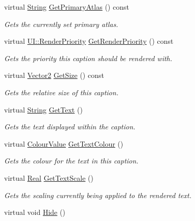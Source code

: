 \begin{DoxyCompactItemize}
virtual \hyperlink{namespaceMezzanine_acf9fcc130e6ebf08e3d8491aebcf1c86}{String} \hyperlink{classMezzanine_1_1UI_1_1Caption_a5c401e39f028e14426714197210e186a}{GetPrimaryAtlas} () const 
\begin{DoxyCompactList}\small\item\em Gets the currently set primary atlas. \item\end{DoxyCompactList}\item 
virtual \hyperlink{namespaceMezzanine_1_1UI_ac4c753eb6b5d66350a243acc9ce54130}{UI::RenderPriority} \hyperlink{classMezzanine_1_1UI_1_1Caption_aadae4d2bb1e8db600864e0121a02e213}{GetRenderPriority} () const 
\begin{DoxyCompactList}\small\item\em Gets the priority this caption should be rendered with. \item\end{DoxyCompactList}\item 
virtual \hyperlink{classMezzanine_1_1Vector2}{Vector2} \hyperlink{classMezzanine_1_1UI_1_1Caption_ad1b3bf8c12122089af1b5896a8da8253}{GetSize} () const 
\begin{DoxyCompactList}\small\item\em Gets the relative size of this caption. \item\end{DoxyCompactList}\item 
virtual \hyperlink{namespaceMezzanine_acf9fcc130e6ebf08e3d8491aebcf1c86}{String} \hyperlink{classMezzanine_1_1UI_1_1Caption_a84706720c8bf07eede9bbeecbf235a79}{GetText} ()
\begin{DoxyCompactList}\small\item\em Gets the text displayed within the caption. \item\end{DoxyCompactList}\item 
virtual \hyperlink{classMezzanine_1_1ColourValue}{ColourValue} \hyperlink{classMezzanine_1_1UI_1_1Caption_a7ef9a623d363094bafe9162d89cbcb2c}{GetTextColour} ()
\begin{DoxyCompactList}\small\item\em Gets the colour for the text in this caption. \item\end{DoxyCompactList}\item 
virtual \hyperlink{namespaceMezzanine_a726731b1a7df72bf3583e4a97282c6f6}{Real} \hyperlink{classMezzanine_1_1UI_1_1Caption_ad0bb9026c09e4b808c1a12f2546a76c5}{GetTextScale} ()
\begin{DoxyCompactList}\small\item\em Gets the scaling currently being applied to the rendered text. \item\end{DoxyCompactList}\item 
\hypertarget{classMezzanine_1_1UI_1_1Caption_a765e0cb49905613c9971cae8369cdc4f}{
virtual void \hyperlink{classMezzanine_1_1UI_1_1Caption_a765e0cb49905613c9971cae8369cdc4f}{Hide} ()}
\label{classMezzanine_1_1UI_1_1Caption_a765e0cb49905613c9971cae8369cdc4f}


\end{DoxyCompactItemize}
